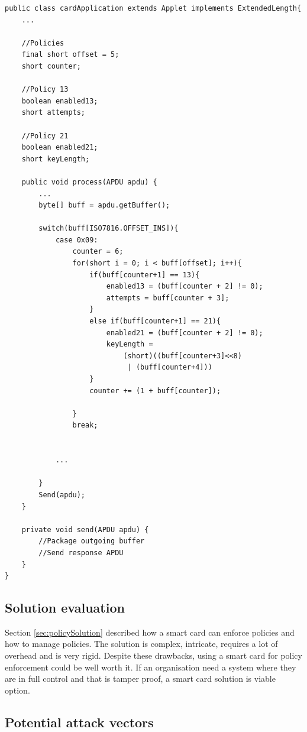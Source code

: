 \begin{lstlisting}[caption=Pseudo code for interpreting policy APDU with java smart card., label=lst:apduPolicy,escapechar=å]
public class cardApplication extends Applet implements ExtendedLength{
    ...

    //Policies
    final short offset = 5;
    short counter;

    //Policy 13
    boolean enabled13;
    short attempts;

    //Policy 21
    boolean enabled21;
    short keyLength;

    public void process(APDU apdu) {
    	...
        byte[] buff = apdu.getBuffer();

    	switch(buff[ISO7816.OFFSET_INS]){
            case 0x09:
                counter = 6;
                for(short i = 0; i < buff[offset]; i++){
                    if(buff[counter+1] == 13){
                        enabled13 = (buff[counter + 2] != 0);
                        attempts = buff[counter + 3];
                    }
                    else if(buff[counter+1] == 21){
                        enabled21 = (buff[counter + 2] != 0);
                        keyLength =
                            (short)((buff[counter+3]<<8)
                             | (buff[counter+4]))
                    }
                    counter += (1 + buff[counter]);

                }
                break;


            ...

    	}
    	Send(apdu);
    }

    private void send(APDU apdu) {
    	//Package outgoing buffer
    	//Send response APDU
    }
}
\end{lstlisting}

\subsection{Solution evaluation}
Section \ref{sec:policySolution} described how a smart card can enforce policies and how to manage policies. The solution is complex, intricate, requires a lot of overhead and is very rigid. Despite these drawbacks, using a smart card for policy enforcement could be well worth it. If an organisation need a system where they are in full control and that is tamper proof, a smart card solution is viable option.

\subsection{Potential attack vectors}
